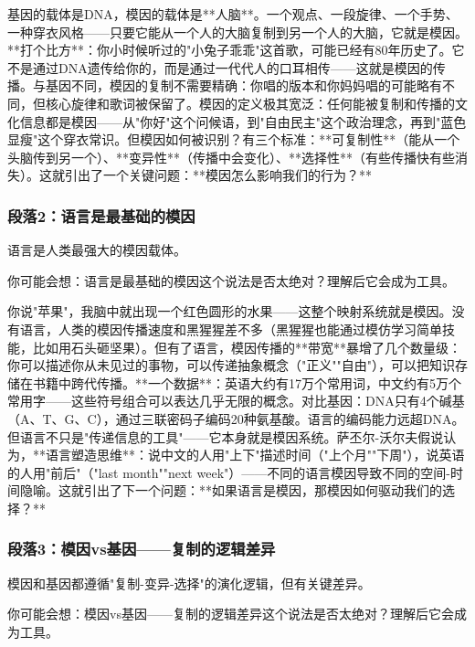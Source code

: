 \documentclass[openany, a4paper, 12pt]{book}
\newenvironment{motivation}{
	\vspace{0.5em}
	\begin{tcolorbox}[
		colback=gray!10,           %
		colframe=gray!60,          %
		title=\textit{本章动机 (Motivation)},
		fonttitle=\bfseries,
		arc=0mm,                   %
		leftrule=3mm               %
		]
		\small \itshape %
	}{
	\end{tcolorbox}
	\vspace{1em}
}
\begin{document}
\begin{motivation}
\begin{motivation}
\begin{motivation}
基因的载体是DNA，模因的载体是**人脑**。一个观点、一段旋律、一个手势、一种穿衣风格——只要它能从一个人的大脑复制到另一个人的大脑，它就是模因。**打个比方**：你小时候听过的"小兔子乖乖"这首歌，可能已经有80年历史了。它不是通过DNA遗传给你的，而是通过一代代人的口耳相传——这就是模因的传播。与基因不同，模因的复制不需要精确：你唱的版本和你妈妈唱的可能略有不同，但核心旋律和歌词被保留了。模因的定义极其宽泛：任何能被复制和传播的文化信息都是模因——从"你好"这个问候语，到"自由民主"这个政治理念，再到"蓝色显瘦"这个穿衣常识。但模因如何被识别？有三个标准：**可复制性**（能从一个头脑传到另一个）、**变异性**（传播中会变化）、**选择性**（有些传播快有些消失）。这就引出了一个关键问题：**模因怎么影响我们的行为？**

	\subsubsection*{段落2：语言是最基础的模因}
	语言是人类最强大的模因载体。
	\begin{tcolorbox}[colback=yellow!5, title=\textit{读者行为预测}]
		你可能会想：语言是最基础的模因这个说法是否太绝对？理解后它会成为工具。
	\end{tcolorbox}

你说"苹果"，我脑中就出现一个红色圆形的水果——这整个映射系统就是模因。没有语言，人类的模因传播速度和黑猩猩差不多（黑猩猩也能通过模仿学习简单技能，比如用石头砸坚果）。但有了语言，模因传播的**带宽**暴增了几个数量级：你可以描述你从未见过的事物，可以传递抽象概念（"正义""自由"），可以把知识存储在书籍中跨代传播。**一个数据**：英语大约有17万个常用词，中文约有5万个常用字——这些符号组合可以表达几乎无限的概念。对比基因：DNA只有4个碱基（A、T、G、C），通过三联密码子编码20种氨基酸。语言的编码能力远超DNA。但语言不只是"传递信息的工具"——它本身就是模因系统。萨丕尔-沃尔夫假说认为，**语言塑造思维**：说中文的人用"上下"描述时间（"上个月""下周"），说英语的人用"前后"（"last month""next week"）——不同的语言模因导致不同的空间-时间隐喻。这就引出了下一个问题：**如果语言是模因，那模因如何驱动我们的选择？**

	\subsubsection*{段落3：模因vs基因——复制的逻辑差异}
	模因和基因都遵循"复制-变异-选择"的演化逻辑，但有关键差异。
	\begin{tcolorbox}[colback=yellow!5, title=\textit{读者行为预测}]
		你可能会想：模因vs基因——复制的逻辑差异这个说法是否太绝对？理解后它会成为工具。
	\end{tcolorbox}


\end{motivation}
\end{motivation}
\end{motivation}
\end{document}
